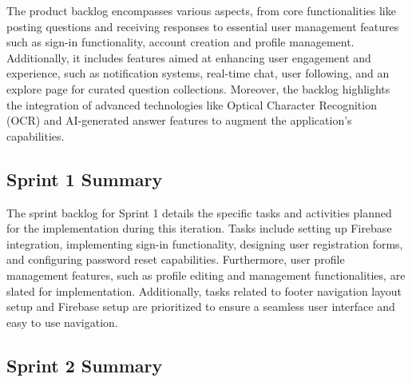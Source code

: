 The product backlog encompasses various aspects, from core functionalities like posting questions and receiving responses to essential user management features such as sign-in functionality, account creation and profile management. Additionally, it includes features aimed at enhancing user engagement and experience, such as notification systems, real-time chat, user following, and an explore page for curated question collections. Moreover, the backlog highlights the integration of advanced technologies like Optical Character Recognition (OCR) and AI-generated answer features to augment the application's capabilities.

\subsection{Sprint 1 Summary}
The sprint backlog for Sprint 1 details the specific tasks and activities planned for the implementation during this iteration. Tasks include setting up Firebase integration, implementing sign-in functionality, designing user registration forms, and configuring password reset capabilities. Furthermore, user profile management features, such as profile editing and management functionalities, are slated for implementation. Additionally, tasks related to footer navigation layout setup and Firebase setup are prioritized to ensure a seamless user interface and easy to use navigation.

\subsection{Sprint 2 Summary}

